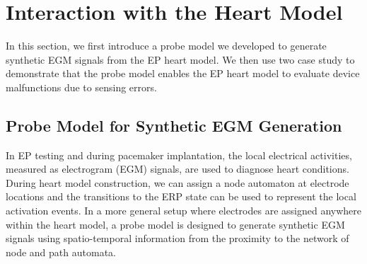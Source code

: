 \section{Interaction with the Heart Model}
In this section, we first introduce a probe model we developed to generate synthetic EGM signals from the EP heart model.
We then use two case study to demonstrate that the probe model enables the EP heart model to evaluate device malfunctions due to sensing errors.
\subsection{Probe Model for Synthetic EGM Generation}
In EP testing and during pacemaker implantation, the local electrical activities, measured as electrogram (EGM) signals, are used to diagnose heart conditions. 
During heart model construction, we can assign a node automaton at electrode locations and the transitions to the ERP state can be used to represent the local activation events. 
In a more general setup where electrodes are assigned anywhere within the heart model, a probe model is designed to generate synthetic EGM signals using spatio-temporal information from the proximity to the network of node and path automata. 

